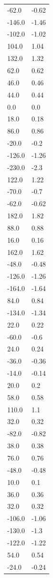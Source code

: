 \begin{longtable}{ll}
-62.0 & -0.62 \\
-146.0 & -1.46 \\
-102.0 & -1.02 \\
104.0 & 1.04 \\
132.0 & 1.32 \\
62.0 & 0.62 \\
46.0 & 0.46 \\
44.0 & 0.44 \\
0.0 & 0.0 \\
18.0 & 0.18 \\
86.0 & 0.86 \\
-20.0 & -0.2 \\
-126.0 & -1.26 \\
-230.0 & -2.3 \\
122.0 & 1.22 \\
-70.0 & -0.7 \\
-62.0 & -0.62 \\
182.0 & 1.82 \\
88.0 & 0.88 \\
16.0 & 0.16 \\
162.0 & 1.62 \\
-48.0 & -0.48 \\
-126.0 & -1.26 \\
-164.0 & -1.64 \\
84.0 & 0.84 \\
-134.0 & -1.34 \\
22.0 & 0.22 \\
-60.0 & -0.6 \\
24.0 & 0.24 \\
-36.0 & -0.36 \\
-14.0 & -0.14 \\
20.0 & 0.2 \\
58.0 & 0.58 \\
110.0 & 1.1 \\
32.0 & 0.32 \\
-82.0 & -0.82 \\
38.0 & 0.38 \\
76.0 & 0.76 \\
-48.0 & -0.48 \\
10.0 & 0.1 \\
36.0 & 0.36 \\
32.0 & 0.32 \\
-106.0 & -1.06 \\
-130.0 & -1.3 \\
-122.0 & -1.22 \\
54.0 & 0.54 \\
-24.0 & -0.24 \\

\end{longtable}
